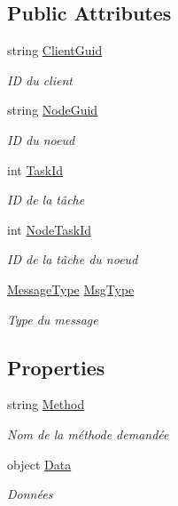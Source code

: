 \subsection*{Public Attributes}
\begin{DoxyCompactItemize}
\item 
string \hyperlink{class_node_net_1_1_data_1_1_data_input_aca3453553072236a2d8bc48f31adef86}{Client\+Guid}
\begin{DoxyCompactList}\small\item\em ID du client \end{DoxyCompactList}\item 
string \hyperlink{class_node_net_1_1_data_1_1_data_input_a451ed8b2510f9b64845eeb248abf89de}{Node\+Guid}
\begin{DoxyCompactList}\small\item\em ID du noeud \end{DoxyCompactList}\item 
int \hyperlink{class_node_net_1_1_data_1_1_data_input_ae05c60d54ba5abf38588e159568b2c5c}{Task\+Id}
\begin{DoxyCompactList}\small\item\em ID de la tâche \end{DoxyCompactList}\item 
int \hyperlink{class_node_net_1_1_data_1_1_data_input_a8676c6aaf50675f4ed1750f23c1d7044}{Node\+Task\+Id}
\begin{DoxyCompactList}\small\item\em ID de la tâche du noeud \end{DoxyCompactList}\item 
\hyperlink{namespace_node_net_1_1_data_a85df1ebe14b4337a629267e033a1272d}{Message\+Type} \hyperlink{class_node_net_1_1_data_1_1_data_input_ab368303333bb1723f35238440c920354}{Msg\+Type}
\begin{DoxyCompactList}\small\item\em Type du message \end{DoxyCompactList}\end{DoxyCompactItemize}
\subsection*{Properties}
\begin{DoxyCompactItemize}
\item 
string \hyperlink{class_node_net_1_1_data_1_1_data_input_a7f65365b917c41dbdb9a3cafd137ca48}{Method}
\begin{DoxyCompactList}\small\item\em Nom de la méthode demandée \end{DoxyCompactList}\item 
object \hyperlink{class_node_net_1_1_data_1_1_data_input_ad81e2687c4540a59ccfa88da89a2f681}{Data}
\begin{DoxyCompactList}\small\item\em Données \end{DoxyCompactList}\end{DoxyCompactItemize}



